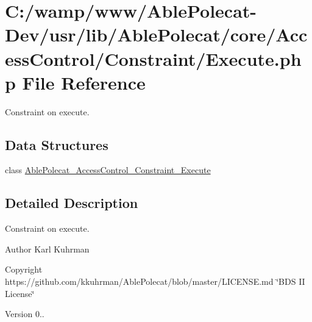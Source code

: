 \hypertarget{_execute_8php}{}\section{C\+:/wamp/www/\+Able\+Polecat-\/\+Dev/usr/lib/\+Able\+Polecat/core/\+Access\+Control/\+Constraint/\+Execute.php File Reference}
\label{_execute_8php}


Constraint on execute.  


\subsection*{Data Structures}
\begin{DoxyCompactItemize}
\item 
class \hyperlink{class_able_polecat___access_control___constraint___execute}{Able\+Polecat\+\_\+\+Access\+Control\+\_\+\+Constraint\+\_\+\+Execute}
\end{DoxyCompactItemize}


\subsection{Detailed Description}
Constraint on execute. 

\begin{DoxyAuthor}{Author}
Karl Kuhrman 
\end{DoxyAuthor}
\begin{DoxyCopyright}{Copyright}
https\+://github.com/kkuhrman/\+Able\+Polecat/blob/master/\+L\+I\+C\+E\+N\+S\+E.\+md \char`\"{}\+B\+D\+S I\+I License\char`\"{} 
\end{DoxyCopyright}
\begin{DoxyVersion}{Version}
0.. 
\end{DoxyVersion}
